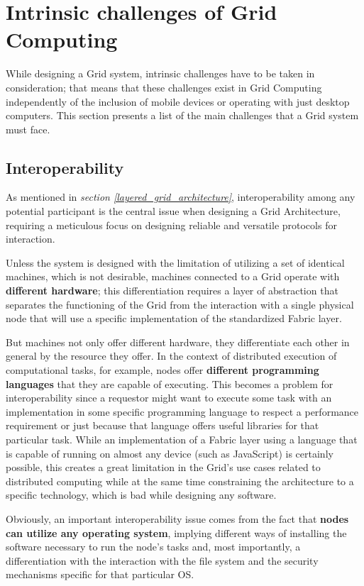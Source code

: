 \section{Intrinsic challenges of Grid Computing}
While designing a Grid system, intrinsic challenges have to be taken in consideration; that means that these challenges exist in Grid Computing independently of the inclusion of mobile devices or operating with just desktop computers. This section presents a list of the main challenges that a Grid system must face.
\vspace{20mm}

\subsection{Interoperability}
As mentioned in \textit{section \ref{layered_grid_architecture}}, interoperability among any potential participant is the central issue when designing a Grid Architecture, requiring a meticulous focus on designing reliable and versatile protocols for interaction.

Unless the system is designed with the limitation of utilizing a set of identical machines, which is not desirable, machines connected to a Grid operate with \textbf{different hardware}; this differentiation requires a layer of abstraction that separates the functioning of the Grid from the interaction with a single physical node that will use a specific implementation of the standardized Fabric layer.

But machines not only offer different hardware, they differentiate each other in general by the resource they offer. In the context of distributed execution of computational tasks, for example, nodes offer \textbf{different programming languages} that they are capable of executing. This becomes a problem for interoperability since a requestor might want to execute some task with an implementation in some specific programming language to respect a performance requirement or just because that language offers useful libraries for that particular task. While an implementation of a Fabric layer using a language that is capable of running on almost any device (such as JavaScript) is certainly possible, this creates a great limitation in the Grid's use cases related to distributed computing while at the same time constraining the architecture to a specific technology, which is bad while designing any software.

Obviously, an important interoperability issue comes from the fact that \textbf{nodes can utilize any operating system}, implying different ways of installing the software necessary to run the node's tasks and, most importantly, a differentiation with the interaction with the file system and the security mechanisms specific for that particular OS.

